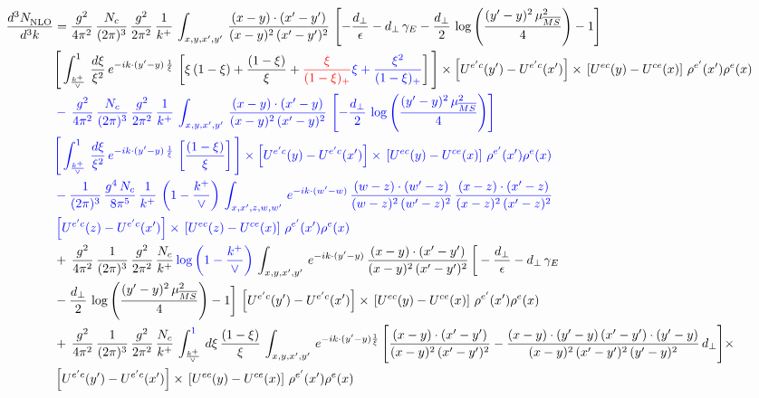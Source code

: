 \documentclass[10pt]{article}
\numberwithin{equation}{section}
\newcommand{\new}[1]{{\color{blue}#1}}
\newcommand{\old}[1]{{\color{red}#1}}
\newcommand{\nc}{\color{blue}}
\begin{document}
\begin{align}
    \frac{d^{3}N_{\rm NLO}^{\rm}}{d^{3}k}  & =  \frac{g^{2}}{4\pi^{2}}\, \frac{N_{c}}{(2\pi)^{3}}\,\frac{g^{2}}{2\pi^{2}}\, \frac{1}{k^{+}}\,\int_{x,y,x',y'}\,\frac{(x-y)\cdot (x'-y')}{(x-y)^{2}\,(x'-y')^{2}}\,\left[-\frac{d_{\perp}}{\epsilon}-d_{\perp}\,\gamma_{E}-\frac{d_{\perp}}{2}\,\log{\left(\frac{(y'-y)^{2}\,\mu^{2}_{\overline{MS}}}{4}\right)}-1\right]\,\notag \\ & \Bigg[\int_{\frac{k^{+}}{\vee}}^{1}\,\frac{d\xi}{\xi^{2}}\,e^{-ik\cdot (y'-y)\,\frac{1}{\xi}}\,\left[\xi\,(1-\xi)+\frac{(1-\xi)}{\xi}+\old{\frac{\xi}{(1-\xi)_{+}}}\new{\xi+\frac{\xi^{2}}{(1-\xi)_{+}}}\right]\Bigg]\times \left[U^{e'c}(y') - U^{e'c}(x')\right] \times\, \left[U^{ec}(y) - U^{ce}(x)\right]\, \rho^{e'}(x') \rho^{e}(x) \notag \\
& \nc  -\,\frac{g^{2}}{4\pi^{2}}\, \frac{N_{c}}{(2\pi)^{3}}\,\frac{g^{2}}{2\pi^{2}}\, \frac{1}{k^{+}}\,\int_{x,y,x',y'}\,\frac{(x-y)\cdot (x'-y)}{(x-y)^{2}\,(x'-y)^{2}}\,\left[-\frac{d_{\perp}}{2}\,\log{\left(\frac{(y'-y)^{2}\,\mu^{2}_{\overline{MS}}}{4}\right)}\right]\,\notag \\ & \nc  \Bigg[\int_{\frac{k^{+}}{\vee}}^{1}\,\frac{d\xi}{\xi^{2}}\,e^{-ik\cdot (y'-y)\,\frac{1}{\xi}}\,\left[\frac{(1-\xi)}{\xi}\right]\Bigg]\times \left[U^{e'c}(y) - U^{e'c}(x')\right] \times\, \left[U^{ec}(y) - U^{ce}(x)\right]\, \rho^{e'}(x') \rho^{e}(x) \notag \\
& \nc  -\frac{1}{(2\pi)^{3}}\,\frac{g^{4}\,N_{c}}{8\pi^{5}}\,\frac{1}{k^{+}}\,\left(1-\frac{k^{+}}{\vee}\right)\,\int_{x,x',z,w,w'}\,e^{-ik\cdot (w'-w)}\,\frac{(w-z)\cdot(w'-z)}{(w-z)^{2}\,(w'-z)^{2}}\,\frac{(x-z)\cdot(x'-z)}{(x-z)^{2}\,(x'-z)^{2}}\notag \\
& \nc  \left[U^{e'c}(z) - U^{e'c}(x')\right] \times\, \left[U^{ec}(z) - U^{ce}(x)\right]\, \rho^{e'}(x') \rho^{e}(x) \notag \\
&  +\, \frac{g^{2}}{4\pi^{2}}\, \frac{1}{(2\pi)^{3}}\,\frac{g^{2}}{2\pi^{2}}\, \frac{N_{c}}{k^{+}}\,\new{\log{\left(1-\frac{k^{+}}{\vee}\right)}}\,\int_{x,y,x',y'}\,e^{-ik\cdot (y'-y)}\,\frac{(x-y)\cdot (x'-y')}{(x-y)^{2}\,(x'-y')^{2}}\,\bigg[-\frac{d_{\perp}}{\epsilon}-d_{\perp}\,\gamma_{E}\notag \\ & -\frac{d_{\perp}}{2}\,\log{\left(\frac{(y'-y)^{2}\,\mu^{2}_{\overline{MS}}}{4}\right)}-1\bigg]\,\left[U^{e'c}(y') - U^{e'c}(x')\right] \times\, \left[U^{ec}(y) - U^{ce}(x)\right]\, \rho^{e'}(x') \rho^{e}(x) \notag \\
& +\,\frac{g^{2}}{4\pi^{2}}\, \frac{1}{(2\pi)^{3}}\,\frac{g^{2}}{2\pi^{2}}\, \frac{N_{c}}{k^{+}}\,\int_{\frac{k^{+}}{\vee}}^{\new{1}}\,d\xi\, \frac{(1-\xi)}{\xi}\, \int_{x,y,x',y'}\,e^{-ik\cdot (y'-y)\frac{1}{\xi}}\,\Bigg[\frac{(x-y)\cdot (x'-y')}{(x-y)^{2}\, (x'-y')^{2}} -\frac{(x-y)\cdot (y'-y)\, (x'-y')\cdot (y'-y)}{(x-y)^{2}\,(x'-y')^{2}\,(y'-y)^{2}}\,d_{\perp}\Bigg]\times\notag \\ &  \left[U^{e'c}(y') - U^{e'c}(x')\right] \times\, \left[U^{ec}(y) - U^{ce}(x)\right]\, \rho^{e'}(x') \rho^{e}(x) \label{eq:F:G2IV}
\end{align}
\end{document}
